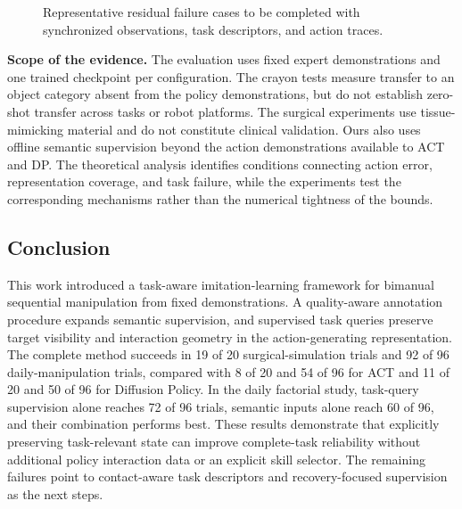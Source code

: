 \begin{figure}[t]
\centering
{}
\caption{Representative residual failure cases to be completed with synchronized observations, task descriptors, and action traces.}
\label{fig:failurecases}
\end{figure}

\noindent\textbf{Scope of the evidence.}
The evaluation uses fixed expert demonstrations and one trained checkpoint per configuration.
The crayon tests measure transfer to an object category absent from the policy demonstrations, but do not establish zero-shot transfer across tasks or robot platforms.
The surgical experiments use tissue-mimicking material and do not constitute clinical validation.
Ours also uses offline semantic supervision beyond the action demonstrations available to ACT and DP.
The theoretical analysis identifies conditions connecting action error, representation coverage, and task failure, while the experiments test the corresponding mechanisms rather than the numerical tightness of the bounds.

\subsection{Conclusion}
This work introduced a task-aware imitation-learning framework for bimanual sequential manipulation from fixed demonstrations.
A quality-aware annotation procedure expands semantic supervision, and supervised task queries preserve target visibility and interaction geometry in the action-generating representation.
The complete method succeeds in 19 of 20 surgical-simulation trials and 92 of 96 daily-manipulation trials, compared with 8 of 20 and 54 of 96 for ACT and 11 of 20 and 50 of 96 for Diffusion Policy.
In the daily factorial study, task-query supervision alone reaches 72 of 96 trials, semantic inputs alone reach 60 of 96, and their combination performs best.
These results demonstrate that explicitly preserving task-relevant state can improve complete-task reliability without additional policy interaction data or an explicit skill selector.
The remaining failures point to contact-aware task descriptors and recovery-focused supervision as the next steps.
